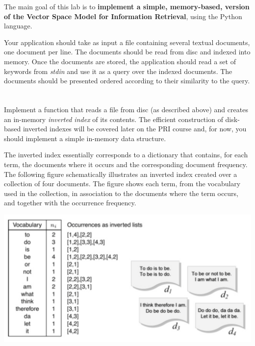 \documentclass[12pt]{article}
\begin{document}

The main goal of this lab is to {\bf implement a simple, memory-based, version of the Vector Space Model for Information Retrieval}, using the Python language.

Your application should take as input a file containing several textual documents, one document per line. The documents should be read from disc and
indexed into memory. Once the documents are stored, the application should read a set of keywords from \emph{stdin} and use it as a query over the indexed
documents. The documents should be presented ordered according to their similarity to the query.

\section{}

Implement a function that reads a file from disc (as described above) and
creates an in-memory \emph{inverted index} of its contents. The efficient construction of disk-based inverted indexes will be covered later on the PRI course and, for now, you should implement a simple in-memory data structure.

The inverted index essentially corresponds to a dictionary that contains, for each term, the documents where it occurs and the corresponding document frequency. The following figure schematically illustrates an inverted index created over a collection of four documents. The figure shows each term, from the vocabulary used in the collection, in association to the documents where the term occurs, and together with the occurrence frequency.

\begin{center}
\includegraphics[scale=0.5]{fig-inverted-index}
\end{center}
\end{document}
